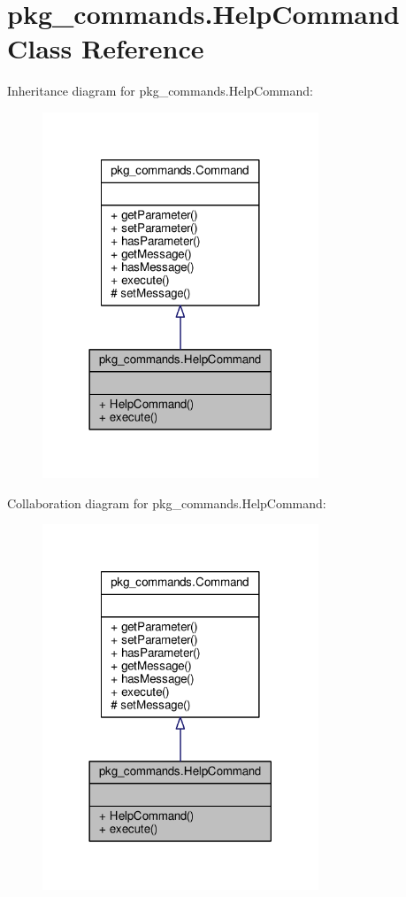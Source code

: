 \hypertarget{classpkg__commands_1_1HelpCommand}{\section{pkg\-\_\-commands.\-Help\-Command Class Reference}
\label{classpkg__commands_1_1HelpCommand}
}


Inheritance diagram for pkg\-\_\-commands.\-Help\-Command\-:
\nopagebreak
\begin{figure}[H]
\begin{center}
\leavevmode
\includegraphics[width=234pt]{classpkg__commands_1_1HelpCommand__inherit__graph}
\end{center}
\end{figure}


Collaboration diagram for pkg\-\_\-commands.\-Help\-Command\-:
\nopagebreak
\begin{figure}[H]
\begin{center}
\leavevmode
\includegraphics[width=234pt]{classpkg__commands_1_1HelpCommand__coll__graph}
\end{center}
\end{figure}
